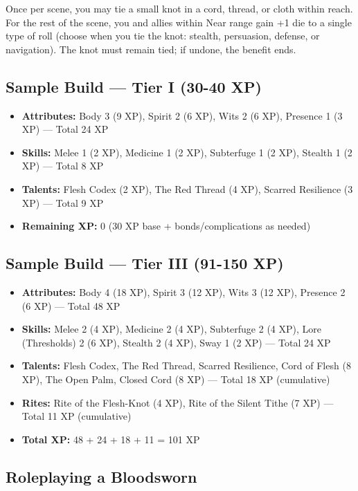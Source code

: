 Once per scene, you may tie a small knot in a cord, thread, or cloth within reach. For the rest of the scene, you and allies within Near range gain +1 die to a single type of roll (choose when you tie the knot: stealth, persuasion, defense, or navigation). The knot must remain tied; if undone, the benefit ends.

\subsection{Sample Build — Tier I (30-40 XP)}

\begin{itemize}
\item \textbf{Attributes:} Body 3 (9 XP), Spirit 2 (6 XP), Wits 2 (6 XP), Presence 1 (3 XP) — Total 24 XP
\item \textbf{Skills:} Melee 1 (2 XP), Medicine 1 (2 XP), Subterfuge 1 (2 XP), Stealth 1 (2 XP) — Total 8 XP
\item \textbf{Talents:} Flesh Codex (2 XP), The Red Thread (4 XP), Scarred Resilience (3 XP) — Total 9 XP
\item \textbf{Remaining XP:} 0 (30 XP base + bonds/complications as needed)
\end{itemize}

\subsection{Sample Build — Tier III (91-150 XP)}

\begin{itemize}
\item \textbf{Attributes:} Body 4 (18 XP), Spirit 3 (12 XP), Wits 3 (12 XP), Presence 2 (6 XP) — Total 48 XP
\item \textbf{Skills:} Melee 2 (4 XP), Medicine 2 (4 XP), Subterfuge 2 (4 XP), Lore (Thresholds) 2 (6 XP), Stealth 2 (4 XP), Sway 1 (2 XP) — Total 24 XP
\item \textbf{Talents:} Flesh Codex, The Red Thread, Scarred Resilience, Cord of Flesh (8 XP), The Open Palm, Closed Cord (8 XP) — Total 18 XP (cumulative)
\item \textbf{Rites:} Rite of the Flesh-Knot (4 XP), Rite of the Silent Tithe (7 XP) — Total 11 XP (cumulative)
\item \textbf{Total XP:} 48 + 24 + 18 + 11 = 101 XP
\end{itemize}

\subsection{Roleplaying a Bloodsworn}

